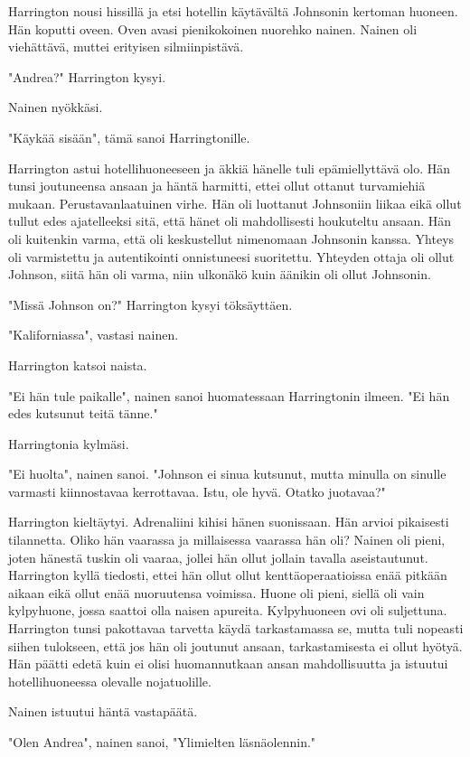 Harrington nousi hissillä ja etsi hotellin käytävältä Johnsonin kertoman huoneen. Hän koputti oveen. Oven avasi pienikokoinen nuorehko nainen. Nainen oli viehättävä, muttei erityisen silmiinpistävä.


"Andrea?" Harrington kysyi.


Nainen nyökkäsi.


"Käykää sisään", tämä sanoi Harringtonille.


Harrington astui hotellihuoneeseen ja äkkiä hänelle tuli epämiellyttävä olo. Hän tunsi joutuneensa ansaan ja häntä harmitti, ettei ollut ottanut turvamiehiä mukaan. Perustavanlaatuinen virhe. Hän oli luottanut Johnsoniin liikaa eikä ollut tullut edes ajatelleeksi sitä, että hänet oli mahdollisesti houkuteltu ansaan. Hän oli kuitenkin varma, että oli keskustellut nimenomaan Johnsonin kanssa. Yhteys oli varmistettu ja autentikointi onnistuneesi suoritettu. Yhteyden ottaja oli ollut Johnson, siitä hän oli varma, niin ulkonäkö kuin äänikin oli ollut Johnsonin.


"Missä Johnson on?" Harrington kysyi töksäyttäen.


"Kaliforniassa", vastasi nainen.


Harrington katsoi naista.


"Ei hän tule paikalle", nainen sanoi huomatessaan Harringtonin ilmeen. "Ei hän edes kutsunut teitä tänne."


Harringtonia kylmäsi.


"Ei huolta", nainen sanoi. "Johnson ei sinua kutsunut, mutta minulla on sinulle varmasti kiinnostavaa kerrottavaa. Istu, ole hyvä. Otatko juotavaa?"


Harrington kieltäytyi. Adrenaliini kihisi hänen suonissaan. Hän arvioi pikaisesti tilannetta. Oliko hän vaarassa ja millaisessa vaarassa hän oli? Nainen oli pieni, joten hänestä tuskin oli vaaraa, jollei hän ollut jollain tavalla aseistautunut. Harrington kyllä tiedosti, ettei hän ollut ollut kenttäoperaatioissa enää pitkään aikaan eikä ollut enää nuoruutensa voimissa. Huone oli pieni, siellä oli vain kylpyhuone, jossa saattoi olla naisen apureita. Kylpyhuoneen ovi oli suljettuna. Harrington tunsi pakottavaa tarvetta käydä tarkastamassa se, mutta tuli nopeasti siihen tulokseen, että jos hän oli joutunut ansaan, tarkastamisesta ei ollut hyötyä. Hän päätti edetä kuin ei olisi huomannutkaan ansan mahdollisuutta ja istuutui hotellihuoneessa olevalle nojatuolille.


Nainen istuutui häntä vastapäätä.


"Olen Andrea", nainen sanoi, "Ylimielten läsnäolennin."


